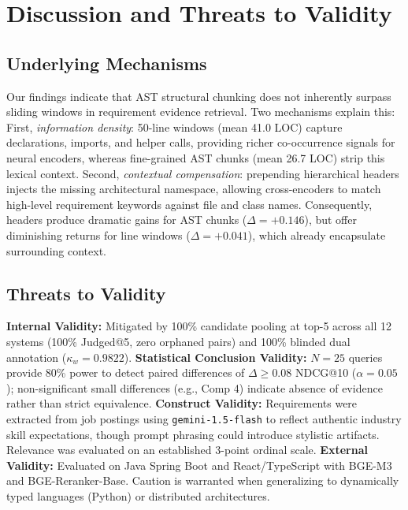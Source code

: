 \section{Discussion and Threats to Validity}
\label{sec:discussion}

\subsection{Underlying Mechanisms}
Our findings indicate that AST structural chunking does not inherently surpass sliding windows in requirement evidence retrieval. 
Two mechanisms explain this: 
First, \textit{information density}: 50-line windows (mean 41.0 LOC) capture declarations, imports, and helper calls, providing richer co-occurrence signals for neural encoders, whereas fine-grained AST chunks (mean 26.7 LOC) strip this lexical context. 
Second, \textit{contextual compensation}: prepending hierarchical headers injects the missing architectural namespace, allowing cross-encoders to match high-level requirement keywords against file and class names. 
Consequently, headers produce dramatic gains for AST chunks ($\Delta = +0.146$), but offer diminishing returns for line windows ($\Delta = +0.041$), which already encapsulate surrounding context.

\subsection{Threats to Validity}
\textbf{Internal Validity:} Mitigated by 100\% candidate pooling at top-5 across all 12 systems (100\% Judged@5, zero orphaned pairs) and 100\% blinded dual annotation ($\kappa_w = 0.9822$).
\textbf{Statistical Conclusion Validity:} $N = 25$ queries provide 80\% power to detect paired differences of $\Delta \ge 0.08$ NDCG@10 ($\alpha = 0.05$); non-significant small differences (e.g., Comp 4) indicate absence of evidence rather than strict equivalence.
\textbf{Construct Validity:} Requirements were extracted from job postings using \texttt{gemini-1.5-flash} to reflect authentic industry skill expectations, though prompt phrasing could introduce stylistic artifacts. Relevance was evaluated on an established 3-point ordinal scale. 
\textbf{External Validity:} Evaluated on Java Spring Boot and React/TypeScript with BGE-M3 and BGE-Reranker-Base. Caution is warranted when generalizing to dynamically typed languages (Python) or distributed architectures.
